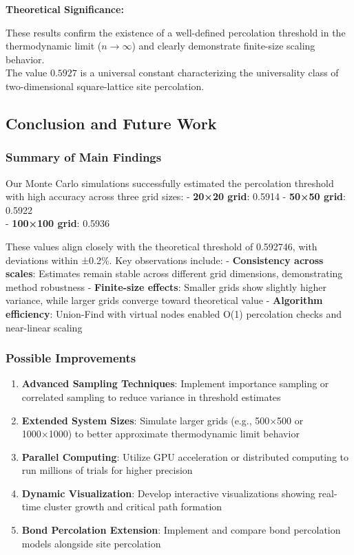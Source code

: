 \documentclass[11pt]{article}
\providecommand{\tightlist}{%
      \setlength{\itemsep}{0pt}\setlength{\parskip}{0pt}}
\begin{document}
\textbf{Theoretical Significance:}

These results confirm the existence of a well-defined percolation
threshold in the thermodynamic limit (\(n\to\infty\)) and clearly
demonstrate finite-size scaling behavior.\\
The value \(0.5927\) is a universal constant characterizing the
universality class of two-dimensional square-lattice site percolation.

    \subsection{Conclusion and Future
Work}\label{conclusion-and-future-work}

\subsubsection{Summary of Main Findings}\label{summary-of-main-findings}

Our Monte Carlo simulations successfully estimated the percolation
threshold with high accuracy across three grid sizes: - \textbf{20×20
grid}: 0.5914 - \textbf{50×50 grid}: 0.5922\\
- \textbf{100×100 grid}: 0.5936

These values align closely with the theoretical threshold of 0.592746,
with deviations within ±0.2\%. Key observations include: -
\textbf{Consistency across scales}: Estimates remain stable across
different grid dimensions, demonstrating method robustness -
\textbf{Finite-size effects}: Smaller grids show slightly higher
variance, while larger grids converge toward theoretical value -
\textbf{Algorithm efficiency}: Union-Find with virtual nodes enabled
O(1) percolation checks and near-linear scaling

\subsubsection{Possible Improvements}\label{possible-improvements}

\begin{enumerate}
\def\labelenumi{\arabic{enumi}.}
\tightlist
\item
  \textbf{Advanced Sampling Techniques}: Implement importance sampling
  or correlated sampling to reduce variance in threshold estimates
\item
  \textbf{Extended System Sizes}: Simulate larger grids (e.g., 500×500
  or 1000×1000) to better approximate thermodynamic limit behavior
\item
  \textbf{Parallel Computing}: Utilize GPU acceleration or distributed
  computing to run millions of trials for higher precision
\item
  \textbf{Dynamic Visualization}: Develop interactive visualizations
  showing real-time cluster growth and critical path formation
\item
  \textbf{Bond Percolation Extension}: Implement and compare bond
  percolation models alongside site percolation
\end{enumerate}
\end{document}

